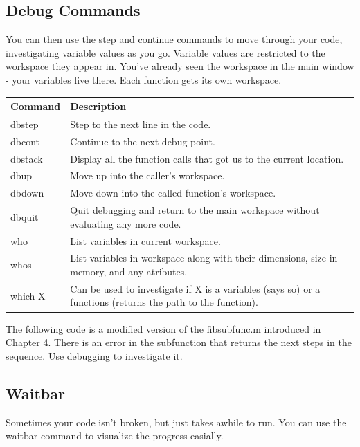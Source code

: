 \pagebreak
\subsection{Debug Commands}
\label{subsec:debugfile}
You can then use the step and continue commands to move through your code, investigating variable values as you go.
 Variable values are restricted to the workspace they appear in.
 You've already seen the workspace in the main window - your variables live there.
 Each function gets its own workspace.

\begin{center}
    \begin{tabular}{ | l | p{7cm} |}
    \hline Command & Description \\ \hline
    dbstep & Step to the next line in the code. \\ \hline
    dbcont & Continue to the next debug point. \\ \hline
    dbstack & Display all the function calls that got us to the current location. \\ \hline
    dbup & Move up into the caller's workspace. \\ \hline
    dbdown & Move down into the called function's workspace. \\ \hline
    dbquit & Quit debugging and return to the main workspace without evaluating any more code. \\ \hline
    who & List variables in current workspace. \\ \hline
    whos & List variables in workspace along with their dimensions, size in memory, and any atributes. \\ \hline
    which X & Can be used to investigate if X is a variables (says so) or a functions (returns the path to the function). \\ \hline
    \end{tabular}
\end{center}

The following code is a modified version of the fibsubfunc.m introduced in Chapter 4.
 There is an error in the subfunction that returns the next steps in the sequence.
 Use debugging to investigate it.

\begin{quote}
 
\end{quote}

\pagebreak
\subsection{Waitbar}
Sometimes your code isn't broken, but just takes awhile to run.
 You can use the waitbar command to visualize the progress easially.

\begin{quote}
 
\end{quote}
